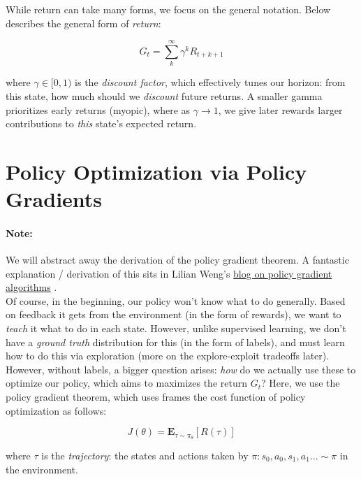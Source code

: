 \documentclass[12pt]{article}
\begin{document}
\noindent While return can take many forms, we focus on the general notation. Below describes the general form of \textit{return}:

\begin{equation}
    G_t = \sum_k^\infty \gamma^k R_{t+k+1}
\end{equation}

\noindent where $\gamma \in [0, 1)$ is the \textit{discount factor}, which effectively tunes our horizon: from this state, how much should we \textit{discount} future returns. A smaller gamma prioritizes early returns (myopic), where as $\gamma \rightarrow 1$, we give later rewards larger contributions to \textit{this} state's expected return.

\section{Policy Optimization via Policy Gradients}

\paragraph{Note:} We will abstract away the derivation of the policy gradient theorem. A fantastic explanation / derivation of this sits in Lilian Weng's \href{https://lilianweng.github.io/lil-log/2018/04/08/policy-gradient-algorithms.html}{blog on policy gradient algorithms} \cite{weng2018PG}. \\

\noindent Of course, in the beginning, our policy won't know what to do generally. Based on feedback it gets from the environment (in the form of rewards), we want to \textit{teach} it what to do in each state. However, unlike supervised learning, we don't have a \textit{ground truth} distribution for this (in the form of labels), and must learn how to do this via exploration (more on the explore-exploit tradeoffs later). \\

\noindent However, without labels, a bigger question arises: \textit{how} do we actually use these to optimize our policy, which aims to maximizes the return $G_t$? Here, we use the policy gradient theorem, which uses frames the cost function of policy optimization as follows:

\begin{equation}
    J(\theta) = \mathbf{E}_{\tau \sim \pi_\theta} [R(\tau)]
\end{equation}

\noindent where $\tau$ is the \textit{trajectory}: the states and actions taken by $\pi: s_0, a_0, s_1, a_1 ... \sim \pi$ in the environment. \\
\end{document}
